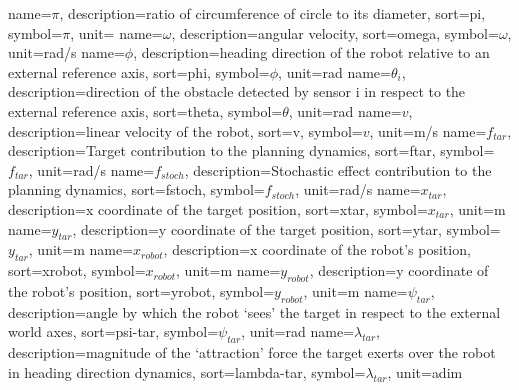 %
{
  name={\ensuremath{\pi}},
  description={ratio of circumference of circle to its diameter},
  sort=pi,
  symbol={\ensuremath{\pi}},
  unit={}
}
%
{
  name={\ensuremath{\omega}},
  description={angular velocity},
  sort=omega,
  symbol={\ensuremath{\omega}},
  unit={\si{rad/s}}
}
%
{
  name={\ensuremath{\phi}},
  description={heading direction of the robot relative to an external reference axis},
  sort=phi,
  symbol={\ensuremath{\phi}},
  unit={\si{rad}}
}
%
{
  name={\ensuremath{\theta_i}},
  description={direction of the obstacle detected by sensor i in respect to the
    external reference axis},
  sort=theta,
  symbol={\ensuremath{\theta}},
  unit={\si{rad}}
}
%
{
  name={\ensuremath{v}},
  description={linear velocity of the robot},
  sort=v,
  symbol={\ensuremath{v}},
  unit={\si{m/s}}
}
{
  name={\ensuremath{f_{tar}}},
  description={Target contribution to the planning dynamics},
  sort=ftar,
  symbol={\ensuremath{f_{tar}}},
  unit={\si{rad/s}}
}
%
{
  name={\ensuremath{f_{stoch}}},
  description={Stochastic effect contribution to the planning dynamics},
  sort=fstoch,
  symbol={\ensuremath{f_{stoch}}},
  unit={\si{rad/s}}
}
%
{
  name={\ensuremath{x_{tar}}},
  description={x coordinate of the target position},
  sort=xtar,
  symbol={\ensuremath{x_{tar}}},
  unit={\si{m}}
}
%
{
  name={\ensuremath{y_{tar}}},
  description={y coordinate of the target position},
  sort=ytar,
  symbol={\ensuremath{y_{tar}}},
  unit={\si{m}}
}
%
{
  name={\ensuremath{x_{robot}}},
  description={x coordinate of the robot's position},
  sort=xrobot,
  symbol={\ensuremath{x_{robot}}},
  unit={\si{m}}
}
%
{
  name={\ensuremath{y_{robot}}},
  description={y coordinate of the robot's position},
  sort=yrobot,
  symbol={\ensuremath{y_{robot}}},
  unit={\si{m}}
}
%
%
{
  name={\ensuremath{\psi_{tar}}},
  description={angle by which the robot `sees' the target in respect to the
    external world axes},
  sort=psi-tar,
  symbol={\ensuremath{\psi_{tar}}},
  unit={\si{rad}}
}
%
{
  name={\ensuremath{\lambda_{tar}}},
  description={magnitude of the `attraction' force the target exerts over the
    robot in heading direction dynamics},
  sort=lambda-tar,
  symbol={\ensuremath{\lambda_{tar}}},
  unit={adim}
}

